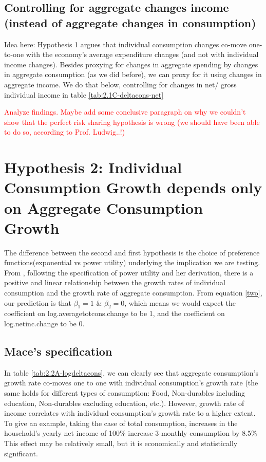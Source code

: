\documentclass[12pt,a4paper]{article}
\begin{document}
\subsection*{Controlling for aggregate changes income (instead of aggregate changes in consumption)} 

Idea here: Hypothesis 1 argues that individual consumption changes co-move one-to-one with the economy's average expenditure changes (and not with individual income changes). Besides proxying for changes in aggregate spending by changes in aggregate consumption (as we did before), we can proxy for it using changes in aggregate income. We do that below, controlling for changes in net/ gross individual income in table \ref{tab:2.1C-deltacons-net}



\textcolor{red}{Analyze findings. Maybe add some conclusive paragraph on why we couldn't show that the perfect risk sharing hypothesis is wrong (we should have been able to do so, according to Prof. Ludwig..!)}

\section*{Hypothesis 2: Individual Consumption Growth depends only on Aggregate Consumption Growth}
The difference between the second and first hypothesis is the choice of preference functions(exponential vs power utility) underlying the implication we are testing. From \citealp{mace1991}, following the specification of power utility and her derivation, there is a positive and linear relationship between the growth rates of individual consumption and the growth rate of aggregate consumption. From equation \eqref{two}, our prediction is that $\beta_1=1$ \& $\beta_2=0$, which means we would expect the coefficient on log.averagetotcons.change to be 1, and the coefficient on log.netinc.change to be 0. 

\subsection*{Mace's specification}

In table \ref{tab:2.2A-logdeltacons}, we can clearly see that aggregate consumption's growth rate co-moves one to one with individual consumption's growth rate (the same holds for different types of consumption: Food, Non-durables including education, Non-durables excluding education, etc.). However,  growth rate of income correlates with individual consumption's growth rate to a higher extent. To give an example, taking the case of total consumption, increases in the household's yearly net income of 100\% increase 3-monthly consumption by 8.5\% This effect may be relatively small, but it is economically and statistically significant.  \\
\end{document}
